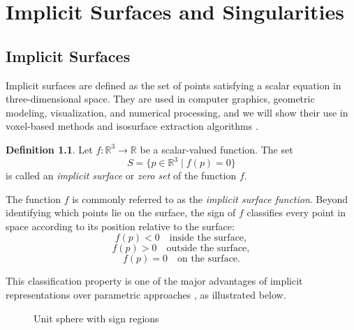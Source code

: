 \documentclass[12pt, a4paper, oneside]{book}
\theoremstyle{plain}
\theoremstyle{definition}
\newtheorem{definition}[theorem]{Definition}
\theoremstyle{remark}
\theoremstyle{definition}
\begin{document}


\newpage

\chapter{Implicit Surfaces and Singularities}
\label{ch:implicit}


\section{Implicit Surfaces}
Implicit surfaces are defined as the set of points satisfying a scalar equation in three-dimensional space. They are used in computer graphics, geometric modeling, visualization, and numerical processing, and we will show their use in voxel-based methods and isosurface extraction algorithms \cite{bloomenthal2000implicit}.

\begin{definition}
\label{def:implicit-surface}
Let $f : \mathbb{R}^3 \to \mathbb{R}$ be a scalar-valued function. The set
\[
S = \{ p \in \mathbb{R}^3 \mid f(p) = 0 \}
\]
is called an \emph{implicit surface} or \emph{zero set} of the function $f$.
\end{definition}

The function $f$ is commonly referred to as the \emph{implicit surface function}. Beyond
identifying which points lie on the surface, the sign of $f$ classifies every point in
space according to its position relative to the surface:
\[
f(p) < 0 \quad \text{inside the surface},
\]
\[
f(p) > 0 \quad \text{outside the surface},
\]
\[
f(p) = 0 \quad \text{on the surface}.
\]

This classification property is one of the major advantages of implicit representations
over parametric approaches \cite{bloomenthal2000implicit}, as illustrated below.


\begin{figure}
    \centering
    \begin{center}
    \end{center}
    \caption{Unit sphere with sign regions}
    \label{fig:unit_sphere}
\end{figure}
\end{document}
